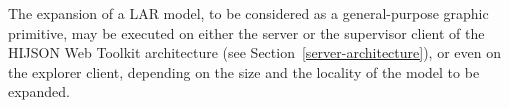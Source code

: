 


The expansion of a LAR model, to be considered as a general-purpose graphic primitive, may be executed on either the server or the supervisor client of the HIJSON Web Toolkit architecture (see Section~\ref{server-architecture}), or even on the explorer client, depending on the size and the locality of the model to be expanded.


